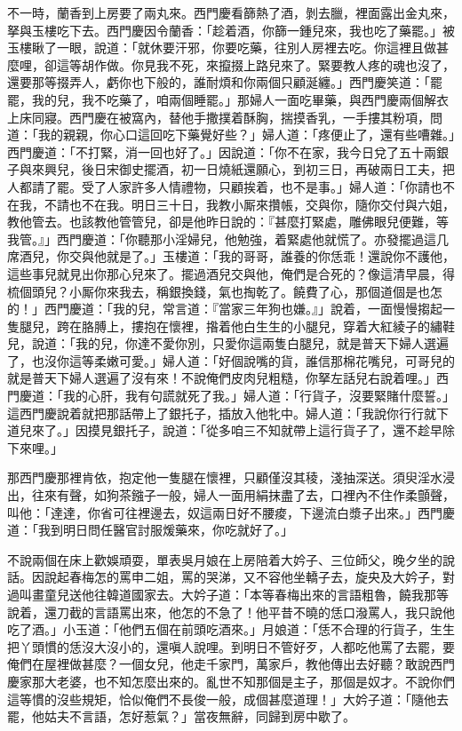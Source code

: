 不一時，蘭香到上房要了兩丸來。西門慶看篩熱了酒，剝去臘，裡面露出金丸來，拏與玉樓吃下去。西門慶因令蘭香：「趁着酒，你篩一鍾兒來，我也吃了藥罷。」被玉樓瞅了一眼，{}說道：「就休要汗邪，你要吃藥，往別人房裡去吃。{}你這裡且做甚麼哩，卻這等胡作做。你見我不死，來攛掇上路兒來了。緊要教人疼的魂也沒了，還要那等掇弄人，虧你也下般的，誰耐煩和你兩個只顧涎纏。」西門慶笑道：「罷罷，我的兒，我不吃藥了，咱兩個睡罷。」那婦人一面吃畢藥，與西門慶兩個解衣上床同寢。西門慶在被窩內，替他手撒撲着酥胸，揣摸香乳，一手摟其粉項，問道：「我的親親，你心口這回吃下藥覺好些？」{}婦人道：「疼便止了，還有些嘈雜。」西門慶道：「不打緊，消一回也好了。」因說道：「你不在家，我今日兌了五十兩銀子與來興兒，後日宋御史擺酒，初一日燒紙還願心，到初三日，再破兩日工夫，把人都請了罷。受了人家許多人情禮物，只顧挨着，也不是事。」婦人道：「你請也不在我，不請也不在我。明日三十日，我教小厮來攢帳，交與你，隨你交付與六姐，教他管去。也該教他管管兒，卻是他昨日說的：『甚麼打緊處，雕佛眼兒便難，等我管。』」西門慶道：「你聽那小淫婦兒，他勉強，着緊處他就慌了。亦發擺過這几席酒兒，你交與他就是了。」{}玉樓道：「我的哥哥，誰養的你恁乖！還說你不護他，這些事兒就見出你那心兒來了。擺過酒兒交與他，俺們是合死的？像這清早晨，得梳個頭兒？小厮你來我去，稱銀換錢，氣也掏乾了。饒費了心，那個道個是也怎的！」{}西門慶道：「我的兒，常言道：『當家三年狗也嫌。』」說着，一面慢慢搊起一隻腿兒，{}跨在胳膊上，摟抱在懷裡，揝着他白生生的小腿兒，穿着大紅綾子的繡鞋兒，說道：「我的兒，你達不愛你別，只愛你這兩隻白腿兒，就是普天下婦人選遍了，也沒你這等柔嫩可愛。」{}婦人道：「好個說嘴的貨，誰信那棉花嘴兒，可哥兒的就是普天下婦人選遍了沒有來！不說俺們皮肉兒粗糙，你拏左話兒右說着哩。」西門慶道：「我的心肝，我有句謊就死了我。」婦人道：「行貨子，沒要緊賭什麼誓。」{}這西門慶說着就把那話帶上了銀托子，插放入他牝中。婦人道：「我說你行行就下道兒來了。」因摸見銀托子，說道：「從多咱三不知就帶上這行貨子了，還不趁早除下來哩。」

那西門慶那裡肯依，抱定他一隻腿在懷裡，只顧僅沒其稜，淺抽深送。須臾淫水浸出，往來有聲，如狗茶鏹子一般，婦人一面用絹抹盡了去，口裡內不住作柔顫聲，叫他：「達達，你省可往裡邊去，奴這兩日好不腰痠，下邊流白漿子出來。」西門慶道：「我到明日問任醫官討服煖藥來，你吃就好了。」

不說兩個在床上歡娛頑耍，單表吳月娘在上房陪着大妗子、三位師父，晚夕坐的說話。因說起春梅怎的罵申二姐，罵的哭涕，又不容他坐轎子去，旋央及大妗子，對過叫畫童兒送他往韓道國家去。大妗子道：「本等春梅出來的言語粗魯，饒我那等說着，還刀截的言語罵出來，他怎的不急了！他平昔不曉的恁口潑罵人，我只說他吃了酒。」小玉道：「他們五個在前頭吃酒來。」月娘道：「恁不合理的行貨子，生生把丫頭慣的恁沒大沒小的，還嗔人說哩。到明日不管好歹，人都吃他罵了去罷，要俺們在屋裡做甚麼？{}一個女兒，他走千家門，萬家戶，教他傳出去好聽？敢說西門慶家那大老婆，也不知怎麼出來的。亂世不知那個是主子，那個是奴才。不說你們這等慣的沒些規矩，恰似俺們不長俊一般，成個甚麼道理！」大妗子道：「隨他去罷，他姑夫不言語，怎好惹氣？」當夜無辭，同歸到房中歇了。

